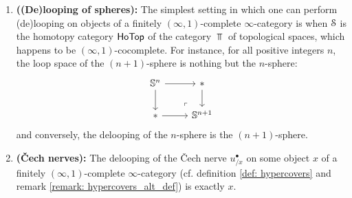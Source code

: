                 \begin{example}
                    \noindent
                    \begin{enumerate}
                        \item \textbf{((De)looping of spheres):} The simplest setting in which one can perform (de)looping on objects of a finitely $(\infty, 1)$-complete $\infty$-category is when $\S$ is the homotopy category $\Ho\Top$ of the category $\Top$ of topological spaces, which happens to be $(\infty, 1)$-cocomplete. For instance, for all positive integers $n$, the loop space of the $(n + 1)$-sphere is nothing but the $n$-sphere:
                            $$
                                \begin{tikzcd}
                                	{\bbS^n} & {*} \\
                                	{*} & {\bbS^{n + 1}}
                                	\arrow[from=1-1, to=2-1]
                                	\arrow[from=2-1, to=2-2]
                                	\arrow[from=1-1, to=1-2]
                                	\arrow[from=1-2, to=2-2]
                                	\arrow["\lrcorner"{anchor=center, pos=0.125, rotate=180}, draw=none, from=2-2, to=1-1]
                                \end{tikzcd}
                            $$
                        and conversely, the delooping of the $n$-sphere is the $(n + 1)$-sphere.
                        \item \textbf{(\v{C}ech nerves):} The delooping of the \v{C}ech nerve $u^{\bullet}_{/x}$ on some object $x$ of a finitely $(\infty, 1)$-complete $\infty$-category (cf. definition \ref{def: hypercovers} and remark \ref{remark: hypercovers_alt_def}) is exactly $x$. 
                    \end{enumerate}
                \end{example}
                
